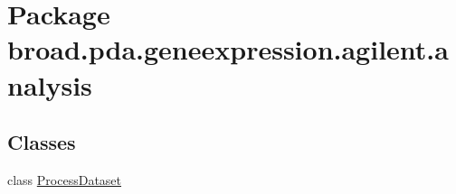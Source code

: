 \hypertarget{namespacebroad_1_1pda_1_1geneexpression_1_1agilent_1_1analysis}{\section{Package broad.\+pda.\+geneexpression.\+agilent.\+analysis}
\label{namespacebroad_1_1pda_1_1geneexpression_1_1agilent_1_1analysis}
}
\subsection*{Classes}
\begin{DoxyCompactItemize}
\item 
class \hyperlink{classbroad_1_1pda_1_1geneexpression_1_1agilent_1_1analysis_1_1_process_dataset}{Process\+Dataset}
\end{DoxyCompactItemize}
